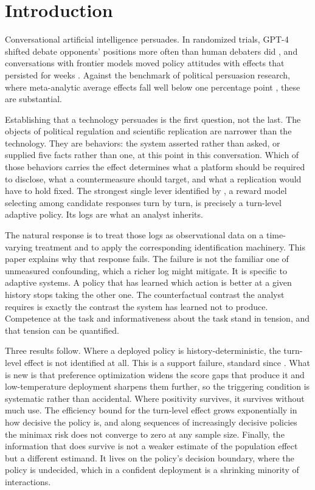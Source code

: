 \documentclass[11pt]{article}
\theoremstyle{definition}
\theoremstyle{remark}
\begin{document}
\section{Introduction}\label{sec:intro}

Conversational artificial intelligence persuades. In randomized trials, GPT-4
shifted debate opponents' positions more often than human debaters did
\citep{salvi2025conversational}, and conversations with frontier models moved
policy attitudes with effects that persisted for weeks
\citep{hackenburg2025levers}. Against the benchmark of political persuasion
research, where meta-analytic average effects fall well below one percentage
point \citep{kalla2018minimal}, these are substantial.

Establishing that a technology persuades is the first question, not the last.
The objects of political regulation and scientific replication are narrower
than the technology. They are behaviors: the system asserted rather than
asked, or supplied five facts rather than one, at this point in this
conversation. Which of those behaviors carries the effect determines what a
platform should be required to disclose, what a countermeasure should target,
and what a replication would have to hold fixed. The strongest single lever
identified by \citet{hackenburg2025levers}, a reward model selecting among
candidate responses turn by turn, is precisely a turn-level adaptive policy.
Its logs are what an analyst inherits.

The natural response is to treat those logs as observational data on a
time-varying treatment and to apply the corresponding identification
machinery. This paper explains why that response fails. The failure is not
the familiar one of unmeasured confounding, which a richer log might
mitigate. It is specific to adaptive systems. A policy that has learned which
action is better at a given history stops taking the other one. The
counterfactual contrast the analyst requires is exactly the contrast the
system has learned not to produce. Competence at the task and
informativeness about the task stand in tension, and that tension can be
quantified.

Three results follow. Where a deployed policy is history-deterministic, the
turn-level effect is not identified at all. This is a support failure,
standard since \citet{robins1986new}. What is new is that preference
optimization widens the score gaps that produce it and low-temperature
deployment sharpens them further, so the triggering condition is systematic
rather than accidental. Where positivity survives, it survives without much
use. The efficiency bound for the turn-level effect grows exponentially in
how decisive the policy is, and along sequences of increasingly decisive
policies the minimax risk does not converge to zero at any sample size.
Finally, the information that does survive is not a weaker estimate of the
population effect but a different estimand. It lives on the policy's decision
boundary, where the policy is undecided, which in a confident deployment is a
shrinking minority of interactions.
\end{document}
